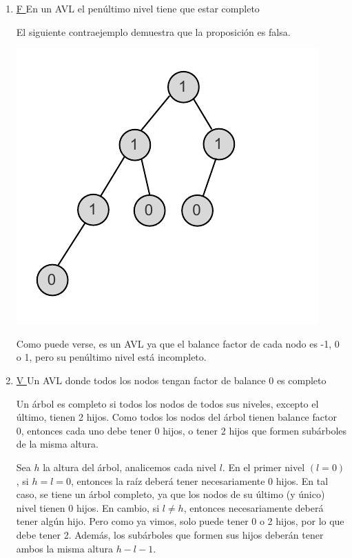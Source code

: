 \documentclass{article}
\begin{document}
\begin{enumerate}[label=\alph*)]
\item \underline{ F } En un AVL el penúltimo nivel tiene que estar completo

El siguiente contraejemplo demuestra que la proposición es falsa.
\begin{center}
    \includegraphics[scale=0.7]{./img/ej6a-arbol.pdf}
\end{center}

Como puede verse, es un AVL ya que el balance factor de cada nodo es -1, 0 o 1, pero su penúltimo nivel está incompleto.


\item \underline{ V } Un AVL donde todos los nodos tengan factor de balance 0 es completo

Un árbol es completo si todos los nodos de todos sus niveles, excepto el último, tienen 2 hijos. Como todos los nodos del árbol tienen balance factor 0, entonces cada uno debe tener 0 hijos, o tener 2 hijos que formen subárboles de la misma altura.

Sea $h$ la altura del árbol, analicemos cada nivel $l$. En el primer nivel $(l=0)$, si $h=l=0$, entonces la raíz deberá tener necesariamente 0 hijos. En tal caso, se tiene un árbol completo, ya que los nodos de su último (y único) nivel tienen 0 hijos. En cambio, si $l\neq h$, entonces necesariamente deberá tener algún hijo. Pero como ya vimos, solo puede tener 0 o 2 hijos, por lo que debe tener 2. Además, los subárboles que formen sus hijos deberán tener ambos la misma altura $h-l-1$.


\end{enumerate}
\end{document}
